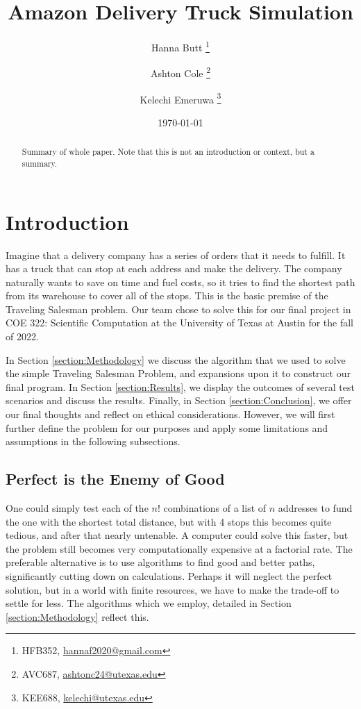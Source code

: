\documentclass[letterpaper]{article}
\title{Amazon Delivery Truck Simulation}
\author{Hanna Butt \thanks{HFB352, \href{mailto:hannaf2020@gmail.com}{hannaf2020@gmail.com}} \and Ashton Cole \thanks{AVC687, \href{mailto:ashtonc24@utexas.edu}{ashtonc24@utexas.edu}} \and Kelechi Emeruwa \thanks{KEE688, \href{mailto:kelechi@utexas.edu}{kelechi@utexas.edu}}}
\date{\today}
\begin{document}
    \maketitle

    \begin{abstract}
        Summary of whole paper. Note that this is not an introduction or context, but a summary.
    \end{abstract}

    \section{Introduction}
    \label{section:Introduction}
    Imagine that a delivery company has a series of orders that it needs to fulfill. It has a truck that can stop at each address and make the delivery. The company naturally wants to save on time and fuel costs, so it tries to find the shortest path from its warehouse to cover all of the stops. This is the basic premise of the Traveling Salesman problem. Our team chose to solve this for our final project in COE 322: Scientific Computation at the University of Texas at Austin for the fall of 2022.
    
    In Section \ref{section:Methodology} we discuss the algorithm that we used to solve the simple Traveling Salesman Problem, and expansions upon it to construct our final program. In Section \ref{section:Results}, we display the outcomes of several test scenarios and discuss the results. Finally, in Section \ref{section:Conclusion}, we offer our final thoughts and reflect on ethical considerations. However, we will first further define the problem for our purposes and apply some limitations and assumptions in the following subsections.

    \subsection{Perfect is the Enemy of Good}
    \label{subsection:Perfect_is_the_Enemy_of_Good}
    One could simply test each of the $n!$ combinations of a list of $n$ addresses to fund the one with the shortest total distance, but with 4 stops this becomes quite tedious, and after that nearly untenable. A computer could solve this faster, but the problem still becomes very computationally expensive at a factorial rate. The preferable alternative is to use algorithms to find good and better paths, significantly cutting down on calculations. Perhaps it will neglect the perfect solution, but in a world with finite resources, we have to make the trade-off to settle for less. The algorithms which we employ, detailed in Section \ref{section:Methodology} reflect this.
\end{document}
